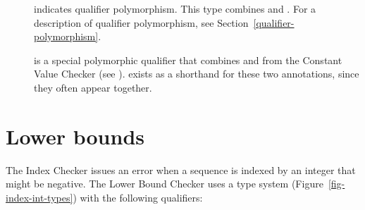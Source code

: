 \begin{description}
%
%

 \item[]
   indicates qualifier polymorphism.  This type combines
    and
   .
   For a description of qualifier polymorphism, see
   Section~\ref{qualifier-polymorphism}.

 \item[]
   is a special polymorphic qualifier that combines
    and
    from the
   Constant Value Checker (see ).
    exists
   as a shorthand for these two annotations, since
   they often appear together.

\end{description}

\section{Lower bounds\label{index-lowerbound}}

The Index Checker issues an error when
a sequence is indexed by an integer that might be negative.
The Lower Bound Checker uses a type system (Figure~\ref{fig-index-int-types}) with the following
qualifiers:

